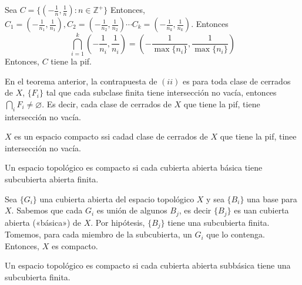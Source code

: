 \begin{ejemplo}
    Sea $C=\{\left(-\frac{1}{n},\frac{1}{n}\right):n\in\mathbb{Z}^+\}$
    Entonces, $C_1=\left(-\frac{1}{n_1},\frac{1}{n_1}\right),C_2=\left(-\frac{1}{n_2},\frac{1}{n_2}\right)\cdots C_k=\left(-\frac{1}{n_k},\frac{1}{n_k}\right)$. 
    Entonces 
    $$\bigcap_{i=1}^k\left(-\frac{1}{n_i},\frac{1}{n_i}\right) = \left(-\frac{1}{\max\{n_i\}},\frac{1}{\max\{n_i\}}\right) $$
    Entonces, $C$ tiene la pif. 
\end{ejemplo}
\begin{nota}
    En el teorema anterior, la contrapuesta de $(ii)$ es para toda clase de cerrados de $X$, $\{F_i\}$ tal que cada subclase finita tiene intersección no vacía, entonces $\bigcap_i F_i\neq \varnothing$. Es decir, cada clase de cerrados de $X$ que tiene la pif, tiene intersección no vacía. 
\end{nota}

\begin{teorema}
    $X$ es un espacio compacto ssi cadad clase de cerrados de $X$ que tiene la pif, tinee intersección no vacía. 
\end{teorema}


\begin{teorema}
    Un espacio topológico es compacto si cada cubierta abierta básica tiene subcubierta abierta finita. 
    \begin{dem}
        Sea $\{G_i\}$ una cubierta abierta del espacio topológico $X$ y sea $\{B_i\}$ una base para $X$. Sabemos que cada $G_i$ es unión de algunos $B_j$, es decir $\{B_j\}$ es uan cubierta abierta («básica») de $X$. Por hipótesis, $\{B_j\}$ tiene una subcubierta finita. Tomemos, para cada miembro de la subcubierta, un $G_i$ que lo contenga. Entonces, $X$ es compacto. 
    \end{dem}
\end{teorema}

\begin{teorema}
    Un espacio topológico es compacto si cada cubierta abierta subbásica tiene una subcubierta finita. 
\end{teorema}

